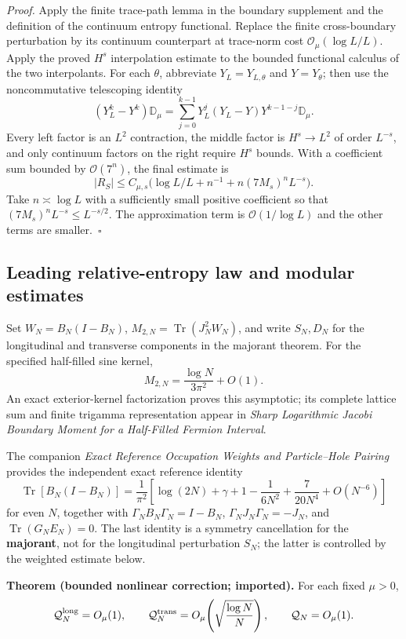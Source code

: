\documentclass[
  10pt,
  a4paper,
]{article}
\begin{document}
\emph{Proof.} Apply the finite trace-path lemma in the boundary supplement and the definition of the continuum entropy functional. Replace the finite cross-boundary perturbation by its continuum counterpart at trace-norm cost \(\mathcal O_\mu(\log L/L)\). Apply the proved \(H^s\) interpolation estimate to the bounded functional calculus of the two interpolants. For each \(\theta\), abbreviate \(Y_L=Y_{L,\theta}\) and \(Y=Y_\theta\); then use the noncommutative telescoping identity \[(Y_L^k-Y^k)\mathbb D_\mu=\sum_{j=0}^{k-1}Y_L^j(Y_L-Y)Y^{k-1-j}\mathbb D_\mu.\] Every left factor is an \(L^2\) contraction, the middle factor is \(H^s\to L^2\) of order \(L^{-s}\), and only continuum factors on the right require \(H^s\) bounds. With a coefficient sum bounded by \(\mathcal O(7^n)\), the final estimate is \[|R_S|\le C_{\mu,s}\bigl(\log L/L+n^{-1}+n(7M_s)^nL^{-s}\bigr).\] Take \(n\asymp\log L\) with a sufficiently small positive coefficient so that \((7M_s)^nL^{-s}\le L^{-s/2}\). The approximation term is \(\mathcal O(1/\log L)\) and the other terms are smaller.~\(\square\)

\subsection{Leading relative-entropy law and modular estimates}\label{leading-relative-entropy-law-and-modular-estimates}

Set \(W_N=B_N(I-B_N)\), \(M_{2,N}=\operatorname{Tr}(J_N^2W_N)\), and write \(S_N,D_N\) for the longitudinal and transverse components in the majorant theorem. For the specified half-filled sine kernel, \[
\boxed{M_{2,N}=\frac{\log N}{3\pi^2}+O(1).}
\] An exact exterior-kernel factorization proves this asymptotic; its complete lattice sum and finite trigamma representation appear in \emph{Sharp Logarithmic Jacobi Boundary Moment for a Half-Filled Fermion Interval}.

The companion \emph{Exact Reference Occupation Weights and Particle--Hole Pairing} provides the independent exact reference identity \[
\operatorname{Tr}[B_N(I-B_N)]=\frac1{\pi^2}\left[
\log(2N)+\gamma+1-\frac1{6N^2}+\frac7{20N^4}+O(N^{-6})\right]
\] for even \(N\), together with \(\Gamma_NB_N\Gamma_N=I-B_N\), \(\Gamma_NJ_N\Gamma_N=-J_N\), and \(\operatorname{Tr}(G_NE_N)=0\). The last identity is a symmetry cancellation for the \textbf{majorant}, not for the longitudinal perturbation \(S_N\); the latter is controlled by the weighted estimate below.

\textbf{Theorem (bounded nonlinear correction; imported).} For each fixed \(\mu>0\), \[
\mathcal Q_N^{\rm long}=O_\mu(1),\qquad
\mathcal Q_N^{\rm trans}=O_\mu\!\left(\sqrt{\frac{\log N}{N}}\right),
\qquad \mathcal Q_N=O_\mu(1).
\]
\end{document}

